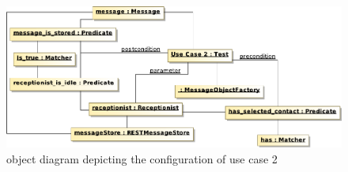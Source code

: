\begin{figure}
  \centering
 
  \includegraphics[scale=0.6]{img/uc2_test_config}
  \caption{object diagram depicting the configuration of use case 2}
  \label{fig:uc2_object_diagram}
\end{figure}


